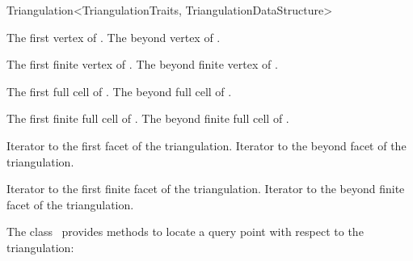 \begin{ccRefClass}{Triangulation<TriangulationTraits, TriangulationDataStructure>}

{}
{The first vertex of \ccVar.}
\ccGlue{}
{The beyond vertex of \ccVar.}

{}
{The first finite vertex of \ccVar.}
\ccGlue{}
{The beyond finite vertex of \ccVar.}

{}
{The first full cell of \ccVar.}
\ccGlue{}
{The beyond full cell of \ccVar.}

{}
{The first finite full cell of \ccVar.}
\ccGlue{}
{The beyond finite full cell of \ccVar.}

{Iterator to the first facet of the triangulation.}
\ccGlue
{}
{Iterator to the beyond facet of the triangulation.}

{Iterator to the first finite facet of the triangulation.}
\ccGlue
{}
{Iterator to the beyond finite facet of the triangulation.}


The class \ccRefName\ provides methods to locate a query point with respect to
the triangulation:


\end{ccRefClass}

